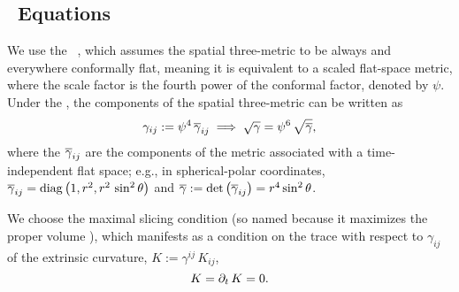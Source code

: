 \subsection{\xcfc\ Equations}

We use the \xcfc\ \citep{wmm1996,ccd2009},
which assumes the spatial three-metric to be always and everywhere
conformally flat, meaning it is
equivalent to a scaled flat-space metric, where the scale factor is the
fourth power of the conformal factor, denoted by $\psi$.
Under the \xcfc, the components of the spatial three-metric can be written as
\begin{equation}
  \gamma_{ij}:=\psi^{4}\,\overline{\gamma}_{ij}
  \implies\sqrt{\gamma}=\psi^{6}\,\sqrt{\overline{\gamma}},
\end{equation}
where the $\overline{\gamma}_{ij}$ are the components of the metric associated
with a time-independent flat space; e.g., in spherical-polar coordinates,
$\overline{\gamma}_{ij}=\mathrm{diag}\left(1,r^{2},r^{2}\,\sin^{2}\theta\right)$
and $\overline{\gamma}:=\det\left(\overline{\gamma}_{ij}\right)=r^{4}\sin^{2}\theta$.

We choose the maximal slicing condition
(so named because it maximizes the proper volume \citep{g2012}),
which manifests as a condition on the trace with respect to $\gamma_{ij}$
of the extrinsic curvature, $K:=\gamma^{ij}\,K_{ij}$,
\begin{equation}
  K=\partial_{t}\,K=0.
\end{equation}

